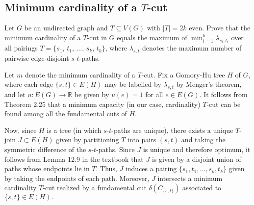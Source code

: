 \documentclass{article}
\begin{document}
  \subsection{Minimum cardinality of a $T$-cut}
  \begin{centerframebox}
    Let $G$ be an undirected graph and $T \subseteq V (G)$ with $|T| = 2k$ even.
    Prove that the minimum cardinality of a $T$-cut in $G$ equals the maximum
    of $\min^k_{i=1} \lambda_{s_i, t_i}$ over all pairings $T = \{s_1,\, t_1,\, \dots,\, s_k,\, t_k\}$,
    where $\lambda_{s,t}$ denotes the maximum number of pairwise edge-disjoint $s$-$t$-paths.
  \end{centerframebox}
  Let $m$ denote the minimum cardinality of a $T$-cut. Fix a Gomory-Hu tree $H$ of $G,$ where each edge $\{s,t\}\in E(H)$ may be labelled by $\lambda_{s,t}$ by Menger's theorem, and let $u:E(G)\rightarrow \mathbb{R}$ be given by $u(e)=1$ for all $e\in E(G).$ It follows from Theorem 2.25 that a minimum capacity (in our case, cardinality) $T$-cut can be found among all the fundamental cuts of $H.$


  Now, since $H$ is a tree (in which $s$-$t$-paths are unique), there exists a unique $T$-join $J\subset E(H)$ given by partitioning $T$ into pairs $(s,t)$ and taking the symmetric difference of the $s$-$t$-paths. Since $J$ is unique and therefore optimum, it follows from Lemma 12.9 in the textbook that $J$ is given by a disjoint union of paths whose endpoints lie in $T$. Thus, $J$ induces a pairing $\{s_1,t_1,\dots ,s_k,t_k\}$ given by taking the endpoints of each path. Moreover, $J$ intersects a minimum cardinality $T$-cut realized by a fundamental cut $\delta(C_{\{s,t\}})$ associated to $\{s,t\}\in E(H).$
\end{document}
